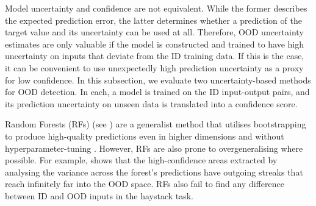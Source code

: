 Model uncertainty and confidence are not equivalent. While the former describes the expected prediction error, the latter determines whether a prediction of the target value and its uncertainty can be used at all. Therefore, OOD uncertainty estimates are only valuable if the model is constructed and trained to have high uncertainty on inputs that deviate from the ID training data. If this is the case, it can be convenient to use unexpectedly high prediction uncertainty as a proxy for low confidence. In this subsection, we evaluate two uncertainty-based methods for OOD detection. In each, a model is trained on the ID input-output pairs, and its prediction uncertainty on unseen data is translated into a confidence score.

Random Forests (RFs) (see ) are a generalist method that utilises bootstrapping to produce high-quality predictions even in higher dimensions and without hyperparameter-tuning \cite{ml-hyperparameters-2021}. However, RFs are also prone to overgeneralising where possible. For example,  shows that the high-confidence areas extracted by analysing the variance across the forest's predictions have outgoing streaks that reach infinitely far into the OOD space. RFs also fail to find any difference between ID and OOD inputs in the haystack task.

